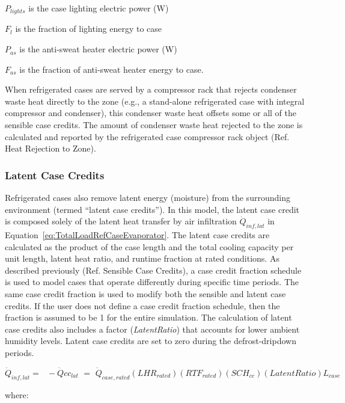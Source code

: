 \({P_{lights}}\) is the case lighting electric power (W)

\({F_l}\) is the fraction of lighting energy to case

\({P_{as}}\) is the anti-sweat heater electric power (W)

\({F_{as}}\) is the fraction of anti-sweat heater energy to case.

When refrigerated cases are served by a compressor rack that rejects condenser waste heat directly to the zone (e.g., a stand-alone refrigerated case with integral compressor and condenser), this condenser waste heat offsets some or all of the sensible case credits. The amount of condenser waste heat rejected to the zone is calculated and reported by the refrigerated case compressor rack object (Ref. Heat Rejection to Zone).

\subsubsection{Latent Case Credits}\label{latent-case-credits}

Refrigerated cases also remove latent energy (moisture) from the surrounding environment (termed ``latent case credits''). In this model, the latent case credit is composed solely of the latent heat transfer by air infiltration \({\dot Q_{inf,lat}}\) in Equation~\ref{eq:TotalLoadRefCaseEvaporator}. The latent case credits are calculated as the product of the case length and the total cooling capacity per unit length, latent heat ratio, and runtime fraction at rated conditions. As described previously (Ref. Sensible Case Credits), a case credit fraction schedule is used to model cases that operate differently during specific time periods. The same case credit fraction is used to modify both the sensible and latent case credits. If the user does not define a case credit fraction schedule, then the fraction is assumed to be 1 for the entire simulation. The calculation of latent case credits also includes a factor (\emph{LatentRatio}) that accounts for lower ambient humidity levels. Latent case credits are set to zero during the defrost-dripdown periods.

\begin{equation}
{\dot Q_{inf,lat}} = \,\,\,\, - \dot Qc{c_{lat}}\,\, = \,\,{\dot Q_{case,rated}}\left( {LH{R_{rated}}} \right)\left( {RT{F_{rated}}} \right)\left( {SC{H_{cc}}} \right)\left( {LatentRatio} \right){L_{case}}
\end{equation}

where:

